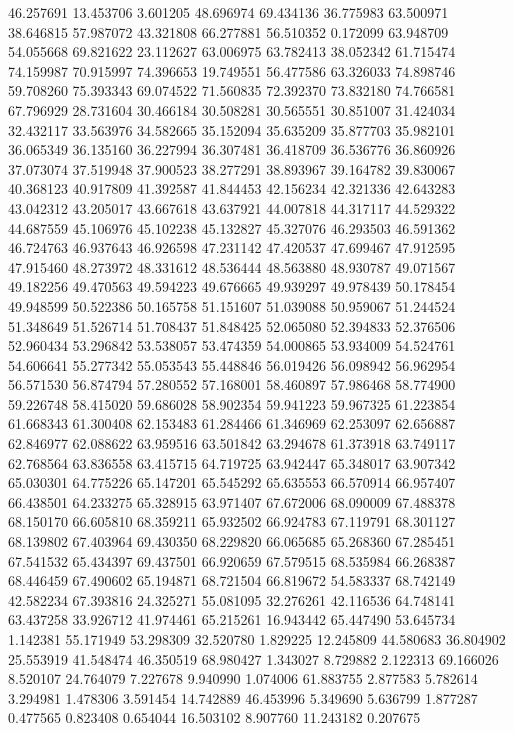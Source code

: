 46.257691
13.453706
3.601205
48.696974
69.434136
36.775983
63.500971
38.646815
57.987072
43.321808
66.277881
56.510352
0.172099
63.948709
54.055668
69.821622
23.112627
63.006975
63.782413
38.052342
61.715474
74.159987
70.915997
74.396653
19.749551
56.477586
63.326033
74.898746
59.708260
75.393343
69.074522
71.560835
72.392370
73.832180
74.766581
67.796929
28.731604
30.466184
30.508281
30.565551
30.851007
31.424034
32.432117
33.563976
34.582665
35.152094
35.635209
35.877703
35.982101
36.065349
36.135160
36.227994
36.307481
36.418709
36.536776
36.860926
37.073074
37.519948
37.900523
38.277291
38.893967
39.164782
39.830067
40.368123
40.917809
41.392587
41.844453
42.156234
42.321336
42.643283
43.042312
43.205017
43.667618
43.637921
44.007818
44.317117
44.529322
44.687559
45.106976
45.102238
45.132827
45.327076
46.293503
46.591362
46.724763
46.937643
46.926598
47.231142
47.420537
47.699467
47.912595
47.915460
48.273972
48.331612
48.536444
48.563880
48.930787
49.071567
49.182256
49.470563
49.594223
49.676665
49.939297
49.978439
50.178454
49.948599
50.522386
50.165758
51.151607
51.039088
50.959067
51.244524
51.348649
51.526714
51.708437
51.848425
52.065080
52.394833
52.376506
52.960434
53.296842
53.538057
53.474359
54.000865
53.934009
54.524761
54.606641
55.277342
55.053543
55.448846
56.019426
56.098942
56.962954
56.571530
56.874794
57.280552
57.168001
58.460897
57.986468
58.774900
59.226748
58.415020
59.686028
58.902354
59.941223
59.967325
61.223854
61.668343
61.300408
62.153483
61.284466
61.346969
62.253097
62.656887
62.846977
62.088622
63.959516
63.501842
63.294678
61.373918
63.749117
62.768564
63.836558
63.415715
64.719725
63.942447
65.348017
63.907342
65.030301
64.775226
65.147201
65.545292
65.635553
66.570914
66.957407
66.438501
64.233275
65.328915
63.971407
67.672006
68.090009
67.488378
68.150170
66.605810
68.359211
65.932502
66.924783
67.119791
68.301127
68.139802
67.403964
69.430350
68.229820
66.065685
65.268360
67.285451
67.541532
65.434397
69.437501
66.920659
67.579515
68.535984
66.268387
68.446459
67.490602
65.194871
68.721504
66.819672
54.583337
68.742149
42.582234
67.393816
24.325271
55.081095
32.276261
42.116536
64.748141
63.437258
33.926712
41.974461
65.215261
16.943442
65.447490
53.645734
1.142381
55.171949
53.298309
32.520780
1.829225
12.245809
44.580683
36.804902
25.553919
41.548474
46.350519
68.980427
1.343027
8.729882
2.122313
69.166026
8.520107
24.764079
7.227678
9.940990
1.074006
61.883755
2.877583
5.782614
3.294981
1.478306
3.591454
14.742889
46.453996
5.349690
5.636799
1.877287
0.477565
0.823408
0.654044
16.503102
8.907760
11.243182
0.207675
